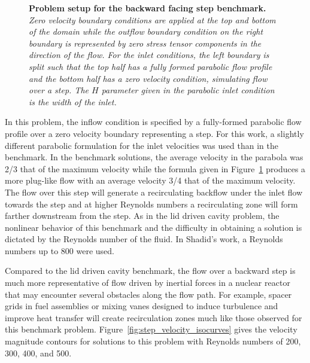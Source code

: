 \begin{figure}[t!]
  \begin{center}
    \scalebox{1.2}{
       }
  \end{center}
  \caption{\textbf{Problem setup for the backward facing step
      benchmark.} \textit{Zero velocity boundary conditions are
      applied at the top and bottom of the domain while the outflow
      boundary condition on the right boundary is represented by zero
      stress tensor components in the direction of the flow. For the
      inlet conditions, the left boundary is split such that the top
      half has a fully formed parabolic flow profile and the bottom
      half has a zero velocity condition, simulating flow over a
      step. The $H$ parameter given in the parabolic inlet condition
      is the width of the inlet.}}
  \label{fig:backward_facing_step}
\end{figure}

In this problem, the inflow condition is specified by a fully-formed
parabolic flow profile over a zero velocity boundary representing a
step. For this work, a slightly different parabolic formulation for
the inlet velocities was used than in the benchmark. In the benchmark
solutions, the average velocity in the parabola was 2/3 that of the
maximum velocity while the formula given in
Figure~\ref{fig:backward_facing_step} produces a more plug-like flow
with an average velocity 3/4 that of the maximum velocity. The flow
over this step will generate a recirculating backflow under the inlet
flow towards the step and at higher Reynolds numbers a recirculating
zone will form farther downstream from the step. As in the lid driven
cavity problem, the nonlinear behavior of this benchmark and the
difficulty in obtaining a solution is dictated by the Reynolds number
of the fluid. In Shadid's work, a Reynolds numbers up to 800 were
used.

Compared to the lid driven cavity benchmark, the flow over a backward
step is much more representative of flow driven by inertial forces in
a nuclear reactor that may encounter several obstacles along the flow
path. For example, spacer grids in fuel assemblies or mixing vanes
designed to induce turbulence and improve heat transfer will create
recirculation zones much like those observed for this benchmark
problem. Figure~\ref{fig:step_velocity_isocurves} gives the velocity
magnitude contours for solutions to this problem with Reynolds numbers
of 200, 300, 400, and 500.

